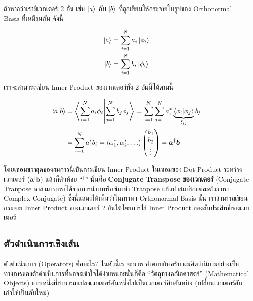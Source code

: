 ถ้าหากว่าเรามีเวกเตอร์ 2 อัน เช่น $\ket{a}$ กับ $\ket{b}$ ที่ถูกเขียนให้กระจายในรูปของ Orthonormal Basis ที่เหมือนกัน ดังนี้

\begin{equation}
  \begin{split}
    \ket{a} &= \sum_{i = 1}^N a_i \ket{\phi_i} \\
    \ket{b} &= \sum_{i = 1}^N b_i \ket{\phi_i}
  \end{split}
\end{equation}

\noindent เราจะสามารถเขียน Inner Product ของเวกเตอร์ทั้ง 2 อันนี้ได้ตามนี้

\begin{equation}
  \begin{split}
    \braket{a}{b} &= \braket{\sum_{i = 1}^N a_i \phi_i}{\sum_{j = 1}^N b_j \phi_j }
    = \sum_{i = 1}^N  \sum_{j = 1}^N a_i^*  \underbrace{\braket{\phi_i}{\phi_j}}_{\delta_{ij}} b_j \\
    &= \sum_{i = 1}^N a_i^* b_i = (\alpha^*_1, \alpha^*_2,\ldots)
    \begin{pmatrix}
      b_1 \\
      b_2 \\
      \vdots
    \end{pmatrix} =
    \bm{a}^\dagger\bm{b}
  \end{split}
\end{equation}

\noindent โดยเทอมขวาสุดของสมการนี้เป็นการเขียน Inner Product ในเทอมของ Dot Product ระหว่างเวกเตอร์ ($\bm{a}^\dagger
  \bm{b}$) แล้วก็ตัวห้อย ``${}^\dagger$'' นั้นคือ \textbf{Conjugate Transpose ของเวกเตอร์} (Conjugate Tranpose
หาสามารถหาได้จากการนำเมทริกซ์มาทำ Tranpose แล้วนำสมาชิกแต่ละตัวมาหา Complex Conjugate) ซึ่งนี่แสดงให้เห็นว่าในการหา Orthonormal
Basis นั้น เราสามารถเขียนกระจาย Inner Product ของเวกเตอร์ 2 อันได้โดยการใช้ Inner Product ของสัมประสิทธิ์ของเวกเตอร์

\subsection{ตัวดำเนินการเชิงเส้น}

ตัวดำเนินการ (Operators) คืออะไร? ในหัวนี้เราจะมาหาคำตอบกันครับ ผมคิดว่านิยามอย่างเป็นทางการของตัวดำเนินการที่พอจะเข้าใจได้ง่ายหน่อยนั่นก็คือ
\enquote{วัตถุทางคณิตศาสตร์} (Mathematical Objects) แบบหนึ่งที่สามารถแปลงเวกเตอร์อันหนึ่งไปเป็นเวกเตอร์อีกอันหนึ่ง
(เปลี่ยนเวกเตอร์อันเก่าให้เป็นอันใหม่)

